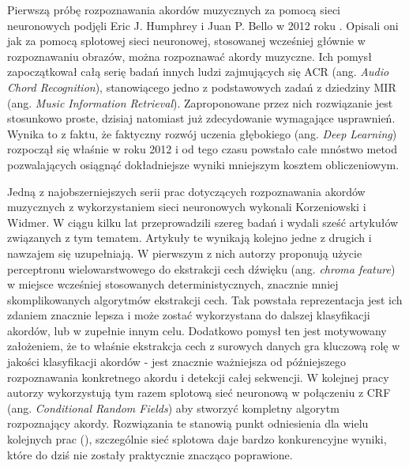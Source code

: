 Pierwszą próbę rozpoznawania akordów muzycznych za pomocą sieci neuronowych podjęli Eric J. Humphrey i Juan P. Bello w 2012 roku \cite{humphrey_rethinking_2012}. Opisali oni jak za pomocą splotowej sieci neuronowej, stosowanej wcześniej głównie w rozpoznawaniu obrazów, można rozpoznawać akordy muzyczne. Ich pomysł zapoczątkował całą serię badań innych ludzi zajmujących się ACR (ang. \emph{Audio Chord Recognition}), stanowiącego jedno z podstawowych zadań z dziedziny MIR (ang. \emph{Music Information Retrieval}). Zaproponowane przez nich rozwiązanie jest stosunkowo proste, dzisiaj natomiast już zdecydowanie wymagające usprawnień. Wynika to z faktu, że faktyczny rozwój uczenia głębokiego (ang. \emph{Deep Learning}) rozpoczął się właśnie w roku 2012 i od tego czasu powstało całe mnóstwo metod pozwalających osiągnąć dokładniejsze wyniki mniejszym kosztem obliczeniowym.

Jedną z najobszerniejszych serii prac dotyczących rozpoznawania akordów muzycznych z wykorzystaniem sieci neuronowych wykonali Korzeniowski i Widmer. W ciągu kilku lat przeprowadzili szereg badań i wydali sześć artykułów związanych z tym tematem. Artykuły te wynikają kolejno jedne z drugich i nawzajem się uzupełniają. W pierwszym z nich \cite{korzeniowski_feature_2016} autorzy proponują użycie perceptronu wielowarstwowego do ekstrakcji cech dźwięku (ang. \emph{chroma feature}) w miejsce wcześniej stosowanych deterministycznych, znacznie mniej skomplikowanych algorytmów ekstrakcji cech. Tak powstała reprezentacja jest ich zdaniem znacznie lepsza i może zostać wykorzystana do dalszej klasyfikacji akordów, lub w zupełnie innym celu. Dodatkowo pomysł ten jest motywowany założeniem, że to właśnie ekstrakcja cech z surowych danych gra kluczową rolę w jakości klasyfikacji akordów - jest znacznie ważniejsza od późniejszego rozpoznawania konkretnego akordu i detekcji całej sekwencji. W kolejnej pracy \cite{korzeniowski_fully_2016} autorzy wykorzystują tym razem splotową sieć neuronową w połączeniu z CRF (ang. \emph{Conditional Random Fields}) aby stworzyć kompletny algorytm rozpoznający akordy. Rozwiązania te stanowią punkt odniesienia dla wielu kolejnych prac (\cite{ohanlon_fifthnet_2021, park_bi-directional_2019}), szczególnie sieć splotowa \cite{korzeniowski_fully_2016} daje bardzo konkurencyjne wyniki, które do dziś nie zostały praktycznie znacząco poprawione.

